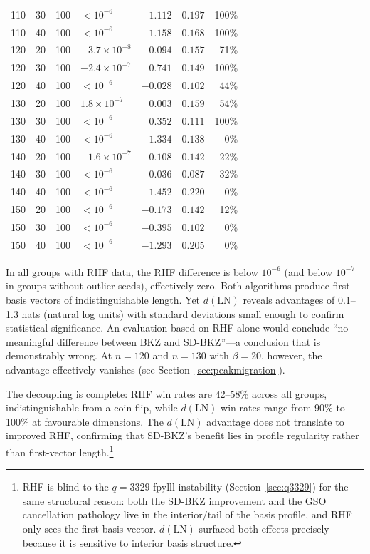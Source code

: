 \documentclass[journal=cic,version=preprint]{iacrj}
\begin{document}
\begin{table}[tbp]
\begin{tabular}{rrrlrrr}
110 & 30 & 100 & $<10^{-6}$ & $1.112$  & $0.197$ & 100\% \\
110 & 40 & 100 & $<10^{-6}$ & $1.158$  & $0.168$ & 100\% \\
120 & 20 & 100 & $-3.7\times 10^{-8}$  & $0.094$  & $0.157$ & 71\% \\
120 & 30 & 100 & $-2.4\times 10^{-7}$  & $0.741$  & $0.149$ & 100\% \\
120 & 40 & 100 & $<10^{-6}$ & $-0.028$ & $0.102$ & 44\% \\
130 & 20 & 100 & $1.8\times 10^{-7}$   & $0.003$  & $0.159$ & 54\% \\
130 & 30 & 100 & $<10^{-6}$ & $0.352$  & $0.111$ & 100\% \\
130 & 40 & 100 & $<10^{-6}$ & $-1.334$ & $0.138$ & 0\% \\
140 & 20 & 100 & $-1.6\times 10^{-7}$  & $-0.108$ & $0.142$ & 22\% \\
140 & 30 & 100 & $<10^{-6}$ & $-0.036$ & $0.087$ & 32\% \\
140 & 40 & 100 & $<10^{-6}$ & $-1.452$ & $0.220$ & 0\% \\
150 & 20 & 100 & $<10^{-6}$ & $-0.173$ & $0.142$ & 12\% \\
150 & 30 & 100 & $<10^{-6}$ & $-0.395$ & $0.102$ & 0\% \\
150 & 40 & 100 & $<10^{-6}$ & $-1.293$ & $0.205$ & 0\% \\
\hline
\end{tabular}
\end{table}

In all groups with RHF data, the RHF difference is below $10^{-6}$ (and below $10^{-7}$ in groups without outlier seeds), effectively zero. Both algorithms produce first basis vectors of indistinguishable length. Yet $d(\mathrm{LN})$ reveals advantages of 0.1--1.3 nats (natural log units) with standard deviations small enough to confirm statistical significance. An evaluation based on RHF alone would conclude ``no meaningful difference between BKZ and SD-BKZ''---a conclusion that is demonstrably wrong. At $n=120$ and $n=130$ with $\beta=20$, however, the advantage effectively vanishes (see Section~\ref{sec:peakmigration}).

The decoupling is complete: RHF win rates are 42--58\% across all groups, indistinguishable from a coin flip, while $d(\mathrm{LN})$ win rates range from 90\% to 100\% at favourable dimensions. The $d(\mathrm{LN})$ advantage does not translate to improved RHF, confirming that SD-BKZ's benefit lies in profile regularity rather than first-vector length.\footnote{RHF is blind to the $q=3329$ fpylll instability (Section~\ref{sec:q3329}) for the same structural reason: both the SD-BKZ improvement and the GSO cancellation pathology live in the interior/tail of the basis profile, and RHF only sees the first basis vector. $d(\mathrm{LN})$ surfaced both effects precisely because it is sensitive to interior basis structure.}
\end{document}
